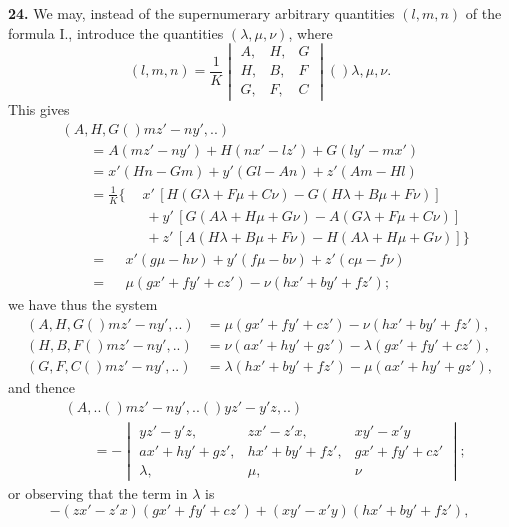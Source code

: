\documentclass[11pt,a4paper]{book}
\providecommand{\qform}[1]{(#1)}
\begin{document}
\textbf{24.} We may, instead of the supernumerary arbitrary quantities $(l, m, n)$ of the formula I., introduce the quantities $(\lambda, \mu, \nu)$, where
\[
(l, m, n) = \frac{1}{K}
\begin{vmatrix}
A, & H, & G \\
H, & B, & F \\
G, & F, & C
\end{vmatrix}
\!\qform{}{\lambda, \mu, \nu}.
\]
This gives
\begin{align*}
&(A, H, G \!\qform{}{mz' - ny',..})\\
&\qquad = A(mz' - ny') + H(nx' - lz') + G(ly' - mx')\\
&\qquad = x'(Hn - Gm) + y'(Gl - An) + z'(Am - Hl)\\
&\qquad = \frac{1}{K}\Big\{\phantom{+} x'\,[H(G\lambda + F\mu + C\nu) - G(H\lambda + B\mu + F\nu)]\\
&\qquad\qquad\qquad + y'\,[G(A\lambda + H\mu + G\nu) - A(G\lambda + F\mu + C\nu)]\\
&\qquad\qquad\qquad + z'\,[A(H\lambda + B\mu + F\nu) - H(A\lambda + H\mu + G\nu)]\Big\}\\
&\qquad = \phantom{\frac{1}{K}\Big\{} x'(g\mu - h\nu) + y'(f\mu - b\nu) + z'(c\mu - f\nu)\\
&\qquad = \phantom{\frac{1}{K}\Big\{} \mu(gx' + fy' + cz') - \nu(hx' + by' + fz');
\end{align*}
we have thus the system
\begin{align*}
(A, H, G \!\qform{}{mz' - ny',..}) &= \mu(gx' + fy' + cz') - \nu(hx' + by' + fz'),\\
(H, B, F \!\qform{}{mz' - ny',..}) &= \nu(ax' + hy' + gz') - \lambda(gx' + fy' + cz'),\\
(G, F, C \!\qform{}{mz' - ny',..}) &= \lambda(hx' + by' + fz') - \mu(ax' + hy' + gz'),
\end{align*}
and thence
\begin{align*}
&(A,..\!\qform{}{mz' - ny',..}\!\qform{}{yz' - y'z,..})\\
&\qquad = -
\begin{vmatrix}
yz' - y'z, & zx' - z'x, & xy' - x'y \\
ax' + hy' + gz', & hx' + by' + fz', & gx' + fy' + cz' \\
\lambda, & \mu, & \nu
\end{vmatrix};
\end{align*}
or observing that the term in $\lambda$ is
\[
-(zx' - z'x)(gx' + fy' + cz') + (xy' - x'y)(hx' + by' + fz'),
\]
\end{document}
